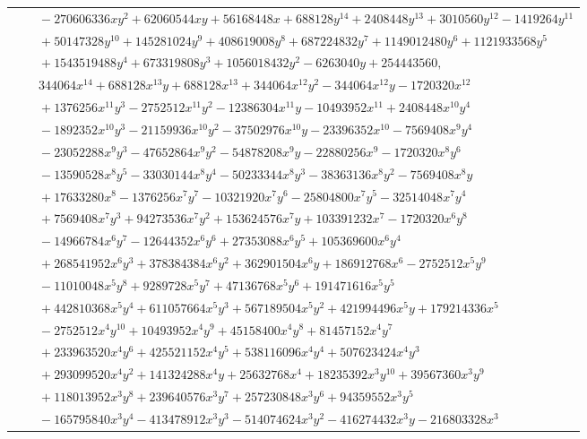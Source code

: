 \documentclass[11pt]{article}
\begin{document}
\begin{longtable}{@{}ll@{}}
 & $\quad -270606336xy^{2}+62060544xy+56168448x+688128y^{14}+2408448y^{13}+3010560y^{12}-1419264y^{11}$\\
 & $\quad +50147328y^{10}+145281024y^{9}+408619008y^{8}+687224832y^{7}+1149012480y^{6}+1121933568y^{5}$\\
 & $\quad +1543519488y^{4}+673319808y^{3}+1056018432y^{2}-6263040y+254443560,$\\
 & $\quad 344064x^{14}+688128x^{13}y+688128x^{13}+344064x^{12}y^{2}-344064x^{12}y-1720320x^{12}$\\
 & $\quad +1376256x^{11}y^{3}-2752512x^{11}y^{2}-12386304x^{11}y-10493952x^{11}+2408448x^{10}y^{4}$\\
 & $\quad -1892352x^{10}y^{3}-21159936x^{10}y^{2}-37502976x^{10}y-23396352x^{10}-7569408x^{9}y^{4}$\\
 & $\quad -23052288x^{9}y^{3}-47652864x^{9}y^{2}-54878208x^{9}y-22880256x^{9}-1720320x^{8}y^{6}$\\
 & $\quad -13590528x^{8}y^{5}-33030144x^{8}y^{4}-50233344x^{8}y^{3}-38363136x^{8}y^{2}-7569408x^{8}y$\\
 & $\quad +17633280x^{8}-1376256x^{7}y^{7}-10321920x^{7}y^{6}-25804800x^{7}y^{5}-32514048x^{7}y^{4}$\\
 & $\quad +7569408x^{7}y^{3}+94273536x^{7}y^{2}+153624576x^{7}y+103391232x^{7}-1720320x^{6}y^{8}$\\
 & $\quad -14966784x^{6}y^{7}-12644352x^{6}y^{6}+27353088x^{6}y^{5}+105369600x^{6}y^{4}$\\
 & $\quad +268541952x^{6}y^{3}+378384384x^{6}y^{2}+362901504x^{6}y+186912768x^{6}-2752512x^{5}y^{9}$\\
 & $\quad -11010048x^{5}y^{8}+9289728x^{5}y^{7}+47136768x^{5}y^{6}+191471616x^{5}y^{5}$\\
 & $\quad +442810368x^{5}y^{4}+611057664x^{5}y^{3}+567189504x^{5}y^{2}+421994496x^{5}y+179214336x^{5}$\\
 & $\quad -2752512x^{4}y^{10}+10493952x^{4}y^{9}+45158400x^{4}y^{8}+81457152x^{4}y^{7}$\\
 & $\quad +233963520x^{4}y^{6}+425521152x^{4}y^{5}+538116096x^{4}y^{4}+507623424x^{4}y^{3}$\\
 & $\quad +293099520x^{4}y^{2}+141324288x^{4}y+25632768x^{4}+18235392x^{3}y^{10}+39567360x^{3}y^{9}$\\
 & $\quad +118013952x^{3}y^{8}+239640576x^{3}y^{7}+257230848x^{3}y^{6}+94359552x^{3}y^{5}$\\
 & $\quad -165795840x^{3}y^{4}-413478912x^{3}y^{3}-514074624x^{3}y^{2}-416274432x^{3}y-216803328x^{3}$\\

\end{longtable}
\end{document}

